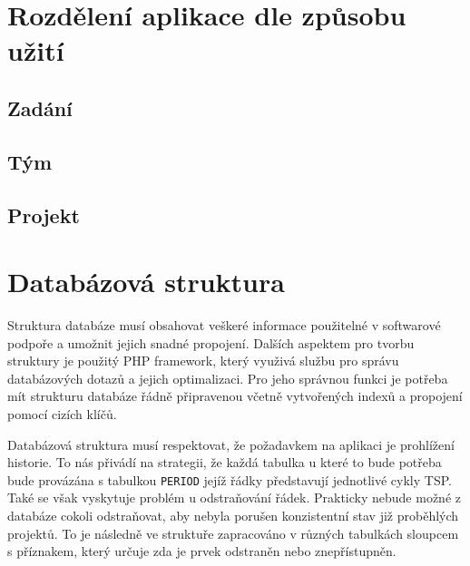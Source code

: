 \documentclass[czech,BP]{thesiskiv}
\begin{document}
	\section{Rozdělení aplikace dle způsobu užití}
		\subsection{Zadání}
			
		\subsection{Tým}
		\subsection{Projekt}
			
	\section{Databázová struktura}
		\par Struktura databáze musí obsahovat veškeré informace použitelné v softwarové podpoře a umožnit jejich snadné propojení. Dalších aspektem pro tvorbu struktury je použitý PHP framework, který využivá službu pro správu databázových dotazů a jejich optimalizaci. Pro jeho správnou funkci je potřeba mít strukturu databáze řádně připravenou včetně vytvořených indexů a propojení pomocí cizích klíčů.
		\par Databázová struktura musí respektovat, že požadavkem na aplikaci je prohlížení historie. To nás přivádí na strategii, že každá tabulka u které to bude potřeba bude provázána s tabulkou \texttt{PERIOD} jejíž řádky představují jednotlivé cykly TSP. Také se však vyskytuje problém u odstraňování řádek. Prakticky nebude možné z databáze cokoli odstraňovat, aby nebyla porušen konzistentní stav již proběhlých projektů. To je následně ve struktuře zapracováno v různých tabulkách sloupcem s příznakem, který určuje zda je prvek odstraněn nebo znepřístupněn.
		
\end{document}
